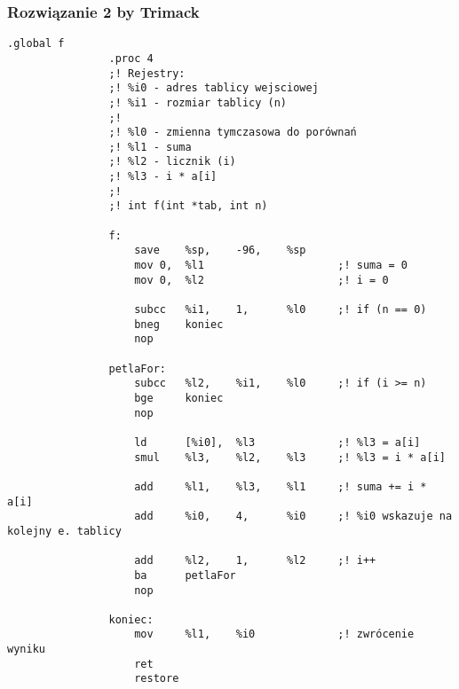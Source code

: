 		\subsubsection{Rozwiązanie 2 by Trimack}
			\begin{lstlisting}[language={[sparc]Assembler}]
				.global f
				.proc 4
				;! Rejestry:
				;! %i0 - adres tablicy wejsciowej
				;! %i1 - rozmiar tablicy (n)
				;!
				;! %l0 - zmienna tymczasowa do porównań
				;! %l1 - suma
				;! %l2 - licznik (i)
				;! %l3 - i * a[i]
				;!
				;! int f(int *tab, int n)
				
				f:
					save	%sp,	-96,	%sp
					mov	0,	%l1						;! suma = 0
					mov	0,	%l2						;! i = 0
				
					subcc	%i1,	1,		%l0		;! if (n == 0)
					bneg	koniec
					nop
				
				petlaFor:	
					subcc	%l2,	%i1,	%l0		;! if (i >= n)
					bge		koniec
					nop
				
					ld		[%i0],	%l3				;! %l3 = a[i]
					smul	%l3,	%l2,	%l3		;! %l3 = i * a[i]
					
					add		%l1,	%l3,	%l1		;! suma += i * a[i]
					add		%i0,	4,		%i0		;! %i0 wskazuje na kolejny e. tablicy
					
					add		%l2,	1,		%l2		;! i++
					ba		petlaFor
					nop
				
				koniec:
					mov		%l1,	%i0				;! zwrócenie wyniku
					ret
					restore
			\end{lstlisting}